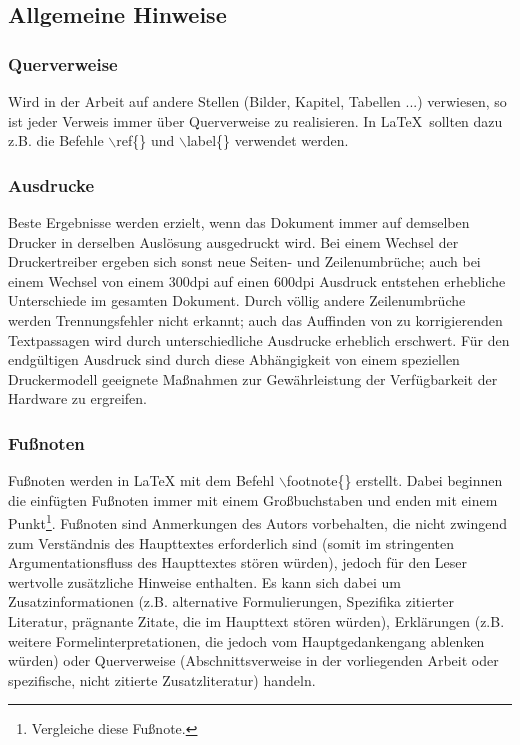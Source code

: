\subsection{Allgemeine Hinweise}
\subsubsection{Querverweise}
Wird in der Arbeit auf andere Stellen (Bilder, Kapitel, Tabellen ...) verwiesen, so ist jeder Verweis immer über Querverweise zu realisieren. In \LaTeX\  sollten dazu z.B. die Befehle $\backslash$ref\{\} und $\backslash$label\{\} verwendet werden.

\subsubsection{Ausdrucke}
Beste Ergebnisse werden erzielt, wenn das Dokument immer auf demselben Drucker in derselben Auslösung ausgedruckt wird. Bei einem Wechsel der Druckertreiber ergeben sich sonst neue Seiten- und Zeilenumbrüche; auch bei einem Wechsel von einem 300dpi auf einen 600dpi Ausdruck entstehen erhebliche Unterschiede im gesamten Dokument. Durch völlig andere Zeilenumbrüche werden Trennungsfehler nicht erkannt; auch das Auffinden von zu korrigierenden Textpassagen wird durch unterschiedliche Ausdrucke erheblich erschwert. Für den endgültigen Ausdruck sind durch diese Abhängigkeit von einem speziellen Druckermodell geeignete Maßnahmen zur Gewährleistung der Verfügbarkeit  der Hardware zu ergreifen.

\subsubsection{Fußnoten}
Fußnoten werden in \LaTeX{} mit dem Befehl $\backslash$footnote\{\} erstellt. Dabei beginnen die einfügten Fußnoten immer mit einem Großbuchstaben und enden mit einem Punkt\footnote{Vergleiche diese Fußnote.}. Fußnoten sind Anmerkungen des Autors vorbehalten, die nicht zwingend zum Verständnis des Haupttextes erforderlich sind (somit im stringenten Argumentationsfluss des Haupttextes stören würden), jedoch für den Leser wertvolle zusätzliche Hinweise enthalten. Es kann sich dabei um Zusatzinformationen (z.B. alternative Formulierungen, Spezifika zitierter Literatur, prägnante Zitate, die im Haupttext stören würden), Erklärungen (z.B. weitere Formelinterpretationen, die jedoch vom Hauptgedankengang ablenken würden) oder Querverweise (Abschnittsverweise in der vorliegenden Arbeit oder spezifische, nicht zitierte Zusatzliteratur) handeln.

